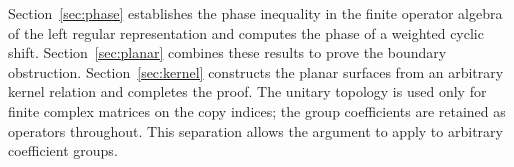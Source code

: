 Section~\ref{sec:phase} establishes the phase inequality in the finite
operator algebra of the left regular representation and computes the
phase of a weighted cyclic shift. Section~\ref{sec:planar} combines
these results to prove the boundary obstruction. Section~\ref{sec:kernel}
constructs the planar surfaces from an arbitrary kernel relation and
completes the proof. The unitary topology is used only for finite complex
matrices on the copy indices; the group coefficients are retained as
operators throughout. This separation allows the argument to apply to
arbitrary coefficient groups.
